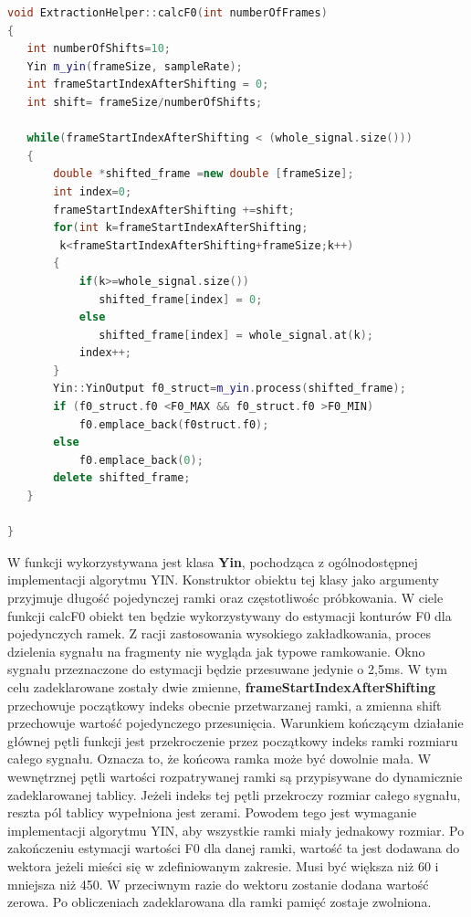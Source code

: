 \documentclass[a4paper,12 pt]{report}
\begin{document}
\FloatBarrier
\newpage
\begin{lstlisting}[caption={Przedstawienie sposobu dokonywania podziału na ramki, wraz z zastosowaniem overlappingu},label={lst:label},language=C++]
void ExtractionHelper::calcF0(int numberOfFrames)
{
   int numberOfShifts=10;
   Yin m_yin(frameSize, sampleRate);
   int frameStartIndexAfterShifting = 0;
   int shift= frameSize/numberOfShifts;

   while(frameStartIndexAfterShifting < (whole_signal.size()))
   {
       double *shifted_frame =new double [frameSize];
       int index=0;
       frameStartIndexAfterShifting +=shift;
       for(int k=frameStartIndexAfterShifting;
		k<frameStartIndexAfterShifting+frameSize;k++)
       {
           if(k>=whole_signal.size())
              shifted_frame[index] = 0;
           else
              shifted_frame[index] = whole_signal.at(k);
           index++;
       }
       Yin::YinOutput f0_struct=m_yin.process(shifted_frame);
       if (f0_struct.f0 <F0_MAX && f0_struct.f0 >F0_MIN)
           f0.emplace_back(f0struct.f0);
       else
           f0.emplace_back(0);
       delete shifted_frame;
   }

}
\end{lstlisting}
W funkcji wykorzystywana jest klasa \textbf{Yin}, pochodząca z ogólnodostępnej implementacji algorytmu YIN. Konstruktor obiektu tej klasy jako argumenty przyjmuje długość pojedynczej ramki oraz częstotliwośc próbkowania.
W ciele funkcji calcF0 obiekt ten będzie wykorzystywany do estymacji konturów F0 dla pojedynczych ramek. 
Z racji zastosowania wysokiego zakładkowania, proces dzielenia sygnału na fragmenty nie wygląda jak typowe ramkowanie. Okno sygnału przeznaczone do estymacji będzie przesuwane jedynie o 2,5ms.
W tym celu zadeklarowane zostały dwie zmienne, \textbf{frameStartIndexAfterShifting} przechowuje początkowy indeks obecnie przetwarzanej ramki, a zmienna shift przechowuje wartość pojedynczego przesunięcia.
Warunkiem kończącym działanie głównej pętli funkcji jest przekroczenie przez początkowy indeks ramki rozmiaru całego sygnału. Oznacza to, że końcowa ramka może być dowolnie mała.
W wewnętrznej pętli wartości rozpatrywanej ramki są przypisywane do dynamicznie zadeklarowanej tablicy. Jeżeli indeks tej pętli przekroczy rozmiar całego sygnału, reszta pól tablicy wypełniona jest zerami. Powodem tego jest wymaganie implementacji algorytmu YIN, aby wszystkie ramki miały jednakowy rozmiar.
Po zakończeniu estymacji wartości F0 dla danej ramki, wartość ta jest dodawana do wektora jeżeli mieści się w zdefiniowanym zakresie. Musi być większa niż 60 i mniejsza niż 450. W przeciwnym razie do wektoru zostanie dodana wartość zerowa. Po obliczeniach zadeklarowana dla ramki pamięć zostaje zwolniona.
\end{document}
